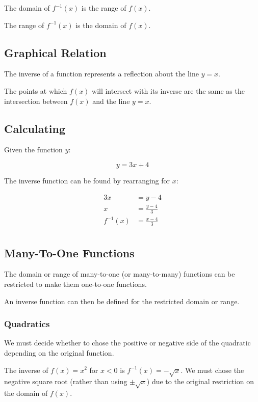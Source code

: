 \documentclass[a4paper,11pt]{article}
\begin{document}
The domain of $f^{-1}(x)$ is the range of $f(x)$.

The range of $f^{-1}(x)$ is the domain of $f(x)$.


\subsection{Graphical Relation}

The inverse of a function represents a reflection about the line $y = x$.

The points at which $f(x)$ will intersect with its inverse are the same as the
intersection between $f(x)$ and the line $y = x$.


\subsection{Calculating}

Given the function $y$:

$$
y = 3x + 4
$$

The inverse function can be found by rearranging for $x$:

$$
\begin{aligned}
3x & = y - 4 \\
x & = \frac{y - 4}{3} \\
f^{-1}(x) & = \frac{x - 4}{3} \\
\end{aligned}
$$


\subsection{Many-To-One Functions}

The domain or range of many-to-one (or many-to-many) functions can be
restricted to make them one-to-one functions.

An inverse function can then be defined for the restricted domain or range.


\subsubsection{Quadratics}

We must decide whether to chose the positive or negative side of the quadratic
depending on the original function.

The inverse of $f(x) = x^2$ for $x < 0$ is $f^{-1}(x) = -\sqrt{x}$. We must
chose the negative square root (rather than using $\pm\sqrt{x}$) due to the
original restriction on the domain of $f(x)$.
\end{document}
